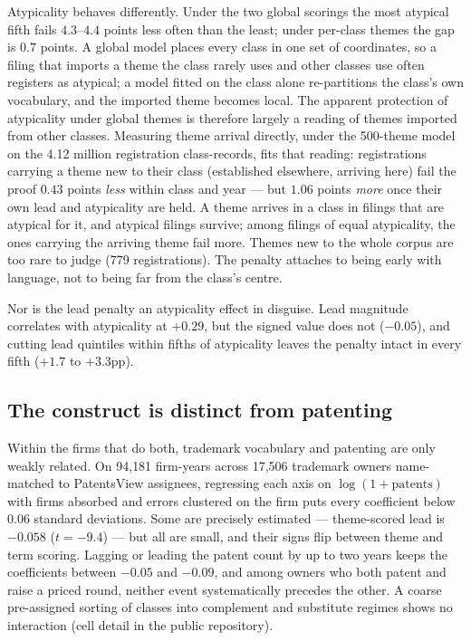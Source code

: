 Atypicality behaves differently. Under the two global scorings the most
atypical fifth fails $4.3$--$4.4$ points less often than the least;
under per-class themes the gap is $0.7$ points. A global model places
every class in one set of coordinates, so a filing that imports a theme
the class rarely uses and other classes use often registers as atypical;
a model fitted on the class alone re-partitions the class's own
vocabulary, and the imported theme becomes local. The apparent
protection of atypicality under global themes is therefore largely a
reading of themes imported from other classes. Measuring theme arrival
directly, under the 500-theme model on the 4.12 million registration
class-records, fits that reading: registrations carrying a theme new to
their class (established elsewhere, arriving here) fail the proof $0.43$
points \emph{less} within class and year --- but $1.06$ points
\emph{more} once their own lead and atypicality are held. A theme
arrives in a class in filings that are atypical for it, and atypical
filings survive; among filings of equal atypicality, the ones carrying
the arriving theme fail more. Themes new to the whole corpus are too
rare to judge (779 registrations). The penalty attaches to being early
with language, not to being far from the class's centre.

Nor is the lead penalty an atypicality effect in disguise. Lead
magnitude correlates with atypicality at $+0.29$, but the signed value
does not ($-0.05$), and cutting lead quintiles within fifths of
atypicality leaves the penalty intact in every fifth ($+1.7$ to
$+3.3$pp).

\subsection{The construct is distinct from patenting}\label{sec:patent}

Within the firms that do both, trademark vocabulary and patenting are
only weakly related. On 94{,}181 firm-years across 17{,}506 trademark
owners name-matched to PatentsView assignees, regressing each axis on
$\log(1 + \mathrm{patents})$ with firms absorbed and errors clustered on
the firm puts every coefficient below $0.06$ standard deviations. Some
are precisely estimated --- theme-scored lead is $-0.058$ ($t = -9.4$)
--- but all are small, and their signs flip between theme and term
scoring. Lagging or leading the patent count by up to two years keeps
the coefficients between $-0.05$ and $-0.09$, and among owners who
both patent and raise a priced round, neither event systematically
precedes the other. A coarse pre-assigned sorting of classes into
complement and substitute regimes shows no interaction (cell detail in
the public repository).

